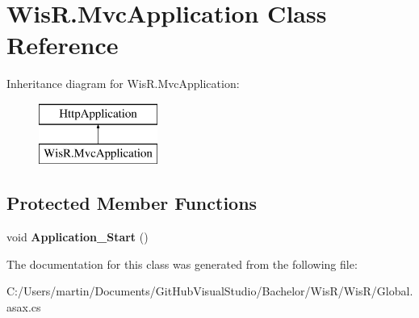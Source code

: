 \hypertarget{class_wis_r_1_1_mvc_application}{}\section{Wis\+R.\+Mvc\+Application Class Reference}
\label{class_wis_r_1_1_mvc_application}
Inheritance diagram for Wis\+R.\+Mvc\+Application\+:\begin{figure}[H]
\begin{center}
\leavevmode
\includegraphics[height=2.000000cm]{class_wis_r_1_1_mvc_application}
\end{center}
\end{figure}
\subsection*{Protected Member Functions}
\begin{DoxyCompactItemize}
\item 
\hypertarget{class_wis_r_1_1_mvc_application_a1fb16c94f87e387d2a35035bf830f08a}{}void {\bfseries Application\+\_\+\+Start} ()\label{class_wis_r_1_1_mvc_application_a1fb16c94f87e387d2a35035bf830f08a}

\end{DoxyCompactItemize}


The documentation for this class was generated from the following file\+:\begin{DoxyCompactItemize}
\item 
C\+:/\+Users/martin/\+Documents/\+Git\+Hub\+Visual\+Studio/\+Bachelor/\+Wis\+R/\+Wis\+R/Global.\+asax.\+cs\end{DoxyCompactItemize}
